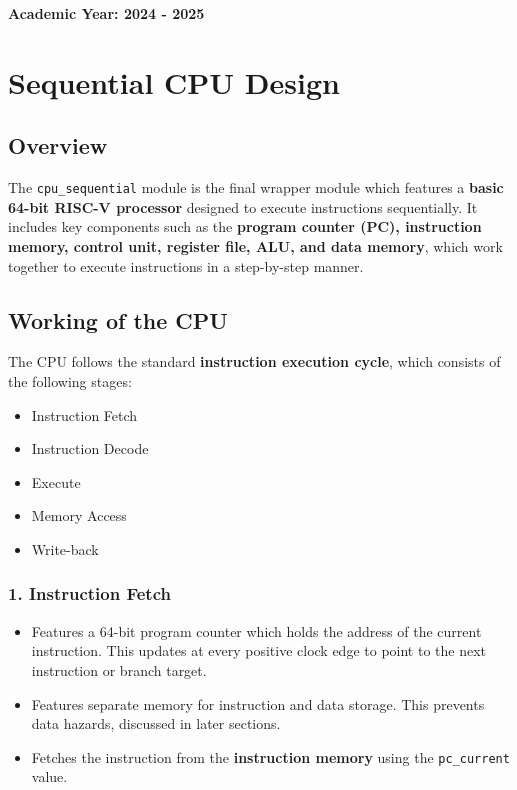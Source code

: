 \documentclass{article}
\numberwithin{figure}{section}
\numberwithin{table}{section}
\begin{document}
\begin{titlepage}
    \vspace{0.8cm}
    
    \vfill
    {\Large\bfseries Academic Year: 2024 - 2025\par}
    \vspace{1.2cm}
\end{titlepage}




\newpage
\tableofcontents
\thispagestyle{fancy}
\newpage
\setcounter{section}{0}
\section{Sequential CPU Design}
\subsection{Overview}
The \texttt{cpu\_sequential} module is the final wrapper module which features a \textbf{basic 64-bit RISC-V processor} designed to execute instructions sequentially. It includes key components such as the \textbf{program counter (PC), instruction memory, control unit, register file, ALU, and data memory}, which work together to execute instructions in a step-by-step manner.
\subsection{Working of the CPU}
The CPU follows the standard \textbf{instruction execution cycle}, which consists of the following stages:
\begin{itemize}
    \item Instruction Fetch
    \item Instruction Decode
    \item Execute
    \item Memory Access
    \item Write-back
\end{itemize}
\subsubsection*{1. Instruction Fetch}
\begin{itemize}
    \item Features a 64-bit program counter which holds the address of the current instruction. This updates at every positive clock edge to point to the next instruction or branch target.
    \item Features separate memory for instruction and data storage. This prevents data hazards, discussed in later sections.
    \item Fetches the instruction from the \textbf{instruction memory} using the \texttt{pc\_current} value.
\end{itemize}
\end{document}
